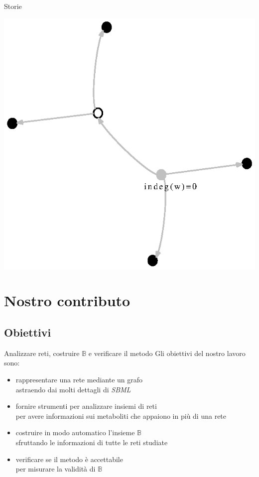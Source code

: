 \documentclass{beamer}
\begin{document}
\begin{frame}{Storie}
\begin{center}
  \includegraphics[scale=0.4]{images/non-story-example.eps}
\end{center} 
\end{frame}

\section{Nostro contributo}

\subsection{Obiettivi}

\begin{frame}{Analizzare reti, costruire $\mathbb{B}$ e verificare il
    metodo}
Gli obiettivi del nostro lavoro sono:
\begin{itemize}
\item<1-> rappresentare una rete mediante un grafo\\
  \footnotesize{astraendo dai molti dettagli di \emph{SBML}}
\item<2-> fornire strumenti per analizzare insiemi di reti\\
  \footnotesize{per avere informazioni sui metaboliti che appaiono in
    pi\`u di una rete}
\item<3-> costruire in modo automatico l'insieme $\mathbb{B}$\\
  \footnotesize{sfruttando le informazioni di tutte le reti studiate}
\item<4-> verificare se il metodo \`e accettabile\\
  \footnotesize{per misurare la validit\`a di $\mathbb{B}$}
\end{itemize}
\end{frame}
\end{document}
